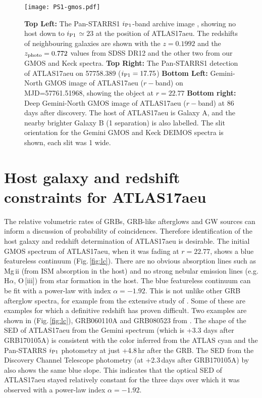 \documentclass[twocolumn]{aastex61}
\newcommand{\ips}{\ensuremath{i_{\rm P1}}}
\begin{document}
\begin{figure*}
\texttt{[image: PS1-gmos.pdf]}
\vspace{-2.5in}
\caption{{\bf Top Left:} The Pan-STARRS1 \ips-band archive image \citep{2016arXiv161205560C}, showing no host down to \ips$\simeq23$ at the position of ATLAS17aeu. The redshifts of neighbouring galaxies are shown 
with the $z=0.1992$  and the $z_{\rm photo}=0.772$ values from SDSS DR12 and the other two from our GMOS and Keck spectra. 
{\bf Top Right:} The Pan-STARRS1 detection of ATLAS17aeu  on 57758.389 ($\ips=17.75$)
{\bf Bottom Left:} Gemini-North GMOS image of ATLAS17aeu ($r-$band) on MJD=57761.51968, showing the object at $r=22.77$
{\bf Bottom right:} Deep Gemini-North GMOS image of ATLAS17aeu ($r-$band) at 86 days after discovery. The host
of ATLAS17aeu is Galaxy A, and the nearby brighter Galaxy B (1 separation) is also labelled. The slit orientation
for the Gemini GMOS and Keck DEIMOS spectra is shown, each slit was 1 wide. }
\label{fig:image}
\end{figure*}


\section{Host galaxy and redshift constraints for ATLAS17aeu}
\label{sec:host}
The relative volumetric rates of GRBs, GRB-like afterglows and GW sources can inform
a discussion of probability of coincidences. Therefore identification of the host
galaxy and redshift determination of ATLAS17aeu is desirable. The initial 
GMOS spectrum of ATLAS17aeu, when it was fading at $r=22.77$, shows a blue 
featureless continuum (Fig.\,\ref{fig:lc}). There are no obvious absorption lines
such as Mg\,{\sc ii} (from ISM absorption in the host) and no strong 
nebular emission lines (e.g. H$\alpha$, O\,[{\sc iii}]) from star formation in the host. 
The blue featureless continuum can be fit with a power-law with index $\alpha=-1.92$. This is not unlike other GRB afterglow spectra,
for example from the extensive study of \cite{2009ApJS..185..526F}. Some of these are examples for
which a definitive redshift has proven difficult. Two examples are 
shown in (Fig.\,\ref{fig:lc}), GRB060110A and GRB080523 from  \cite{2009ApJS..185..526F}. 
The shape of the SED of ATLAS17aeu from the Gemini spectrum (which is +3.3 days after GRB170105A) is consistent with the color inferred from the 
ATLAS cyan and 
the Pan-STARRS $\ips$ photometry at just +4.8\,hr after the
GRB. The SED from the Discovery Channel Telescope 
photometry  (at +2.3\,days after GRB170105A) by \cite{GCN20397} also shows the same 
blue slope. This indicates that the optical SED of ATLAS17aeu stayed
relatively constant for the three days over which it was observed with a power-law  index $\alpha=-1.92$.
\end{document}
